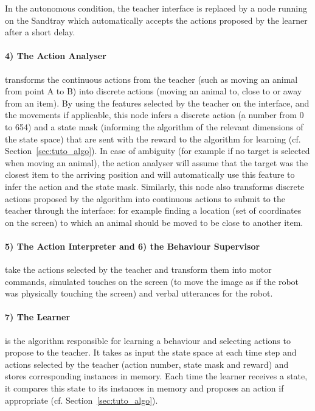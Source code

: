 In the autonomous condition, the teacher interface is replaced by a node running on the Sandtray which automatically accepts the actions proposed by the learner after a short delay.

\paragraph{4) The Action Analyser} transforms the continuous actions from the teacher (such as moving an animal from point A to B) into discrete actions (moving an animal to, close to or away from an item). By using the features selected by the teacher on the interface, and the movements if applicable, this node infers a discrete action (a number from 0 to 654) and a state mask (informing the algorithm of the relevant dimensions of the state space) that are sent with the reward to the algorithm for learning (cf. Section~\ref{sec:tuto_algo}). In case of ambiguity (for example if no target is selected when moving an animal), the action analyser will assume that the target was the closest item to the arriving position and will automatically use this feature to infer the action and the state mask. Similarly, this node also transforms discrete actions proposed by the algorithm into continuous actions to submit to the teacher through the interface: for example finding a location (set of coordinates on the screen) to which an animal should be moved to be close to another item.

\paragraph{5) The Action Interpreter and 6) the Behaviour Supervisor} take the actions selected by the teacher and transform them into motor commands, simulated touches on the screen (to move the image as if the robot was physically touching the screen) and verbal utterances for the robot.

\paragraph{7) The Learner} is the algorithm responsible for learning a behaviour and selecting actions to propose to the teacher. It takes as input the state space at each time step and actions selected by the teacher (action number, state mask and reward) and stores corresponding instances in memory. Each time the learner receives a state, it compares this state to its instances in memory and proposes an action if appropriate (cf. Section~\ref{sec:tuto_algo}).

